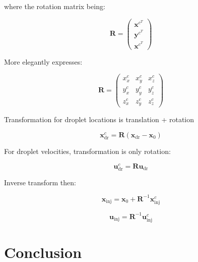 where the rotation matrix being:

\begin{equation}
\boldsymbol{R} = \begin{pmatrix} \boldsymbol{x}^{c^T} \\ \boldsymbol{y}^{c^T} \\ \boldsymbol{x}^{c^T} \end{pmatrix}
\end{equation}

More elegantly expresses:

\begin{equation}
\boldsymbol{R} = \begin{pmatrix} x^c_x & x^c_y & x^c_z \\ y^c_x & y^c_y & y^c_z \\ z^c_x & z^c_y & z^c_z \end{pmatrix}
\end{equation}



Transformation for droplet locations is translation + rotation

\begin{equation}
\boldsymbol{x}^c_\mathrm{dr} = \boldsymbol{R} \left( \boldsymbol{x}_\mathrm{dr} -  \boldsymbol{x}_0 \right)
\end{equation}

For droplet velocities, transformation is only rotation:

\begin{equation}
\boldsymbol{u}^c_\mathrm{dr} = \boldsymbol{R} \boldsymbol{u}_\mathrm{dr}
\end{equation}

Inverse transform then:

\begin{equation}
\boldsymbol{x}_\mathrm{inj} = \boldsymbol{x}_0 + \boldsymbol{R}^{-1} \boldsymbol{x}_\mathrm{inj}^c
\end{equation}

\begin{equation}
\boldsymbol{u}_\mathrm{inj} = \boldsymbol{R}^{-1} \boldsymbol{u}_\mathrm{inj}^c
\end{equation}

\section{Conclusion}

